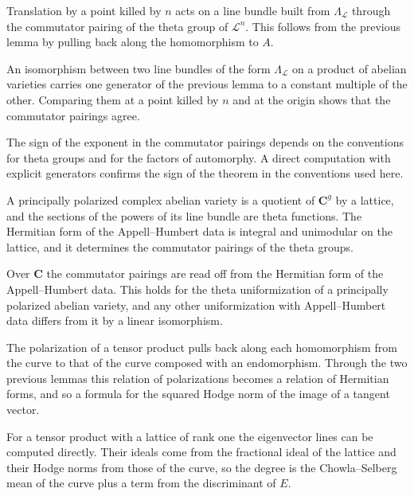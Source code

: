 Translation by a point killed by $n$ acts on a line bundle built from $\Lambda_{\mathcal L}$ through the commutator
pairing of the theta group of $\mathcal L^n$. This follows from the previous lemma by pulling back along the
homomorphism to $A$.

An isomorphism between two line bundles of the form $\Lambda_{\mathcal L}$ on a product of abelian varieties carries
one generator of the previous lemma to a constant multiple of the other. Comparing them at a point killed by $n$ and at
the origin shows that the commutator pairings agree.

The sign of the exponent in the commutator pairings depends on the conventions for theta groups and for the factors of
automorphy. A direct computation with explicit generators confirms the sign of the theorem in the conventions used here.

A principally polarized complex abelian variety is a quotient of $\mathbf C^g$ by a lattice, and the sections of the
powers of its line bundle are theta functions. The Hermitian form of the Appell--Humbert data is integral and
unimodular on the lattice, and it determines the commutator pairings of the theta groups.

Over $\mathbf C$ the commutator pairings are read off from the Hermitian form of the Appell--Humbert data. This holds
for the theta uniformization of a principally polarized abelian variety, and any other uniformization with
Appell--Humbert data differs from it by a linear isomorphism.

The polarization of a tensor product pulls back along each homomorphism from the curve to that of the curve composed
with an endomorphism. Through the two previous lemmas this relation of polarizations becomes a relation of Hermitian
forms, and so a formula for the squared Hodge norm of the image of a tangent vector.

For a tensor product with a lattice of rank one the eigenvector lines can be computed directly. Their ideals come from
the fractional ideal of the lattice and their Hodge norms from those of the curve, so the degree is the
Chowla--Selberg mean of the curve plus a term from the discriminant of $E$.

